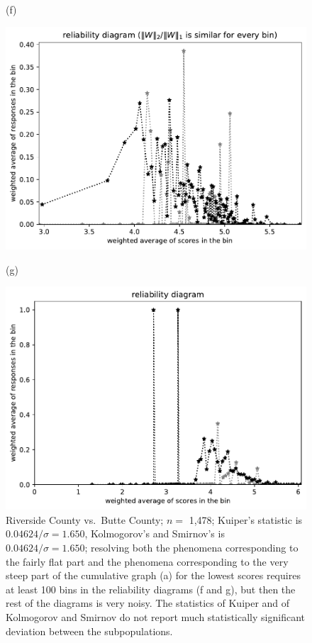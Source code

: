 \documentclass{article}
\newlength{\imsize}
\begin{document}
\begin{figure}
\begin{centering}
(f)
\parbox{\imsize}{\includegraphics[width=\imsize]
{../codes/weighted/County_of_Riverside_vs_Butte-LNGI/equierrs100.pdf}}
\quad\quad
(g)
\parbox{\imsize}{\includegraphics[width=\imsize]
{../codes/weighted/County_of_Riverside_vs_Butte-LNGI/equiscores100.pdf}}

\end{centering}
\caption{Riverside County vs.\ Butte County; $n =$ 1,478;
         Kuiper's statistic is $0.04624 / \sigma = 1.650$,
         Kolmogorov's and Smirnov's is $0.04624 / \sigma = 1.650$;
         resolving both the phenomena corresponding to the fairly flat part
         and the phenomena corresponding to the very steep part
         of the cumulative graph (a) for the lowest scores requires
         at least 100 bins in the reliability diagrams (f and g),
         but then the rest of the diagrams is very noisy.
         The statistics of Kuiper and of Kolmogorov and Smirnov do not report
         much statistically significant deviation between the subpopulations.
}
\label{Riverside-Butte}
\end{figure}
\end{document}
